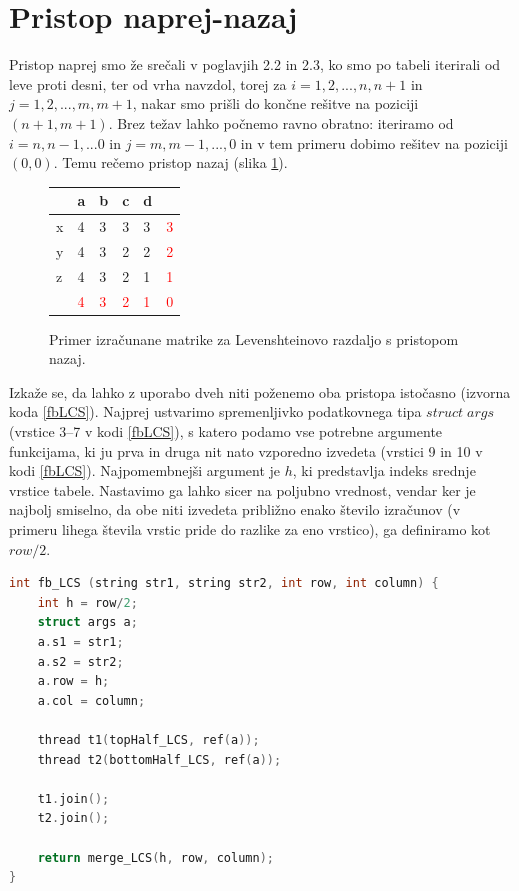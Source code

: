 \documentclass[a4paper,12pt,openright]{book}
\begin{document}
\section{Pristop naprej-nazaj}

Pristop naprej smo že srečali v poglavjih 2.2 in 2.3, ko smo po tabeli iterirali od leve proti desni, ter od vrha navzdol, torej za $i = 1,2, ..., n, n+1$ in $j = 1,2, ..., m, m+1$, nakar smo prišli do končne rešitve na poziciji $(n+1, m+1)$. Brez težav lahko počnemo ravno obratno: iteriramo od $i = n, n-1, ... 0$ in $j = m, m-1, ..., 0$ in v tem primeru dobimo rešitev na poziciji $(0, 0)$. Temu rečemo pristop nazaj (slika \ref{levenshteinBackwardExample}). 

\begin{figure}[htb]
\centering
\begin{tabular}{|l|l|l|l|l|l|}
\cline{2-5}
  \multicolumn{1}{c|}{}  & a & b & c & d\\ \hline
x & \cellcolor{blue!25}4 & \cellcolor{blue!15}3 & 3 & 3 & \textcolor{red}{3}\\ \hline
y  & 4 & 3 &  \cellcolor{blue!15}2 & 2 & \textcolor{red}{2}\\ \hline
z  & 4 & 3 & 2 & \cellcolor{blue!15}1 & \textcolor{red}{1} \\ \hline
\multicolumn{1}{c|}{}  & \textcolor{red}{4} & \textcolor{red}{3} & \textcolor{red}{2} & \textcolor{red}{1} & \textcolor{red}{0} \\ \cline{2-6}
\end{tabular}
\caption{Primer izračunane matrike za Levenshteinovo razdaljo s pristopom nazaj.}
\label{levenshteinBackwardExample}
\end{figure}

Izkaže se, da lahko z uporabo dveh niti poženemo oba pristopa istočasno (izvorna koda \ref{fbLCS}). Najprej ustvarimo spremenljivko podatkovnega tipa $struct \; args$ (vrstice 3--7 v kodi \ref{fbLCS}), s katero podamo vse potrebne argumente funkcijama, ki ju prva in druga nit nato vzporedno izvedeta (vrstici 9 in 10 v kodi \ref{fbLCS}). Najpomembnejši argument je $h$, ki predstavlja indeks srednje vrstice tabele. Nastavimo ga lahko sicer na poljubno vrednost, vendar ker je najbolj smiselno, da obe niti izvedeta približno enako število izračunov (v primeru lihega števila vrstic pride do razlike za eno vrstico), ga definiramo kot $row/2$. 

\bigskip
\begin{lstlisting}[language=C++, caption={Algoritem LCS naprej-nazaj.}, captionpos=b, label=fbLCS]
int fb_LCS (string str1, string str2, int row, int column) {
    int h = row/2;
    struct args a; 
    a.s1 = str1;
    a.s2 = str2;
    a.row = h;
    a.col = column;

    thread t1(topHalf_LCS, ref(a));
    thread t2(bottomHalf_LCS, ref(a));
    
    t1.join();
    t2.join();

    return merge_LCS(h, row, column);
}
\end{lstlisting}
\end{document}
